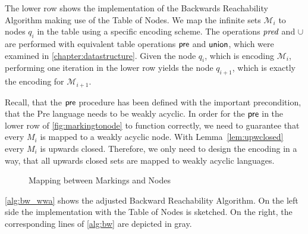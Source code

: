 \par 

The lower row shows the implementation of the Backwards Reachability Algorithm making use of the Table of Nodes. We map the infinite sets $\mathcal{M}_{i}$ to nodes $q_{i}$ in the table using a specific encoding scheme. The operations $\operatorname{\textit{pred}}$ and $\cup$ are performed with equivalent table operations $\operatorname{\textsf{pre}}$ and $\operatorname{\textsf{union}}$, which were examined in \autoref{chapter:datastructure}.
Given the node $q_{i}$, which is encoding $\mathcal{M}_{i}$, performing one iteration in the lower row yields the node $q_{i+1}$, which is exactly the encoding for $\mathcal{M}_{i+1}$.

Recall, that the $\operatorname{\textsf{pre}}$ procedure has been defined with the important precondition, that the Pre language needs to be weakly acyclic. In order for the $\operatorname{\textsf{pre}}$ in the lower row of \autoref{fig:markingtonode} to function correctly, we need to guarantee that every $M_{i}$ is mapped to a weakly acyclic node. With Lemma~\autoref{lem:upwclosed} every $M_{i}$ is upwards closed. Therefore, we only need to design the encoding in a way, that all upwards closed sets are mapped to weakly acyclic languages.

\begin{figure}[htb]
\centering
\caption{Mapping between Markings and Nodes}\label{fig:markingtonode}
\end{figure}

\par

\autoref{alg:bw_wwa} shows the adjusted Backward Reachability Algorithm. On the left side the implementation with the Table of Nodes is sketched. On the right, the corresponding lines of \autoref{alg:bw} are depicted in gray.

\par 

